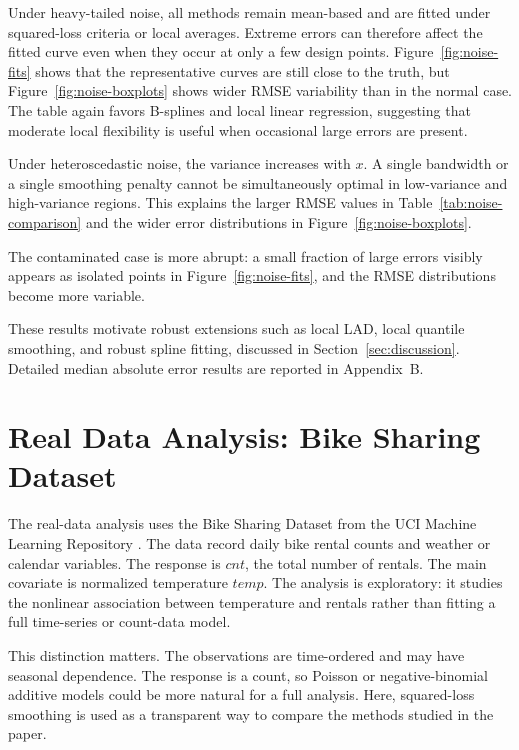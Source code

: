 \documentclass[12pt,a4paper]{article}
\newcommand{\FloatBarrier}{\par}
\begin{document}
Under heavy-tailed noise, all methods remain mean-based and are fitted under squared-loss criteria or local averages. Extreme errors can therefore affect the fitted curve even when they occur at only a few design points. Figure~\ref{fig:noise-fits} shows that the representative curves are still close to the truth, but Figure~\ref{fig:noise-boxplots} shows wider RMSE variability than in the normal case. The table again favors B-splines and local linear regression, suggesting that moderate local flexibility is useful when occasional large errors are present.

Under heteroscedastic noise, the variance increases with \(x\). A single bandwidth or a single smoothing penalty cannot be simultaneously optimal in low-variance and high-variance regions. This explains the larger RMSE values in Table~\ref{tab:noise-comparison} and the wider error distributions in Figure~\ref{fig:noise-boxplots}. 

The contaminated case is more abrupt: a small fraction of large errors visibly appears as isolated points in Figure~\ref{fig:noise-fits}, and the RMSE distributions become more variable. 

These results motivate robust extensions such as local LAD, local quantile smoothing, and robust spline fitting, discussed in Section~\ref{sec:discussion}. Detailed median absolute error results are reported in Appendix~B.
\FloatBarrier

\section{Real Data Analysis: Bike Sharing Dataset}
\label{sec:realdata}

The real-data analysis uses the Bike Sharing Dataset from the UCI Machine Learning Repository \citep{fanaee2014event}. The data record daily bike rental counts and weather or calendar variables. The response is \(cnt\), the total number of rentals. The main covariate is normalized temperature \(temp\). The analysis is exploratory: it studies the nonlinear association between temperature and rentals rather than fitting a full time-series or count-data model.

This distinction matters. The observations are time-ordered and may have seasonal dependence. The response is a count, so Poisson or negative-binomial additive models could be more natural for a full analysis. Here, squared-loss smoothing is used as a transparent way to compare the methods studied in the paper.
\end{document}
